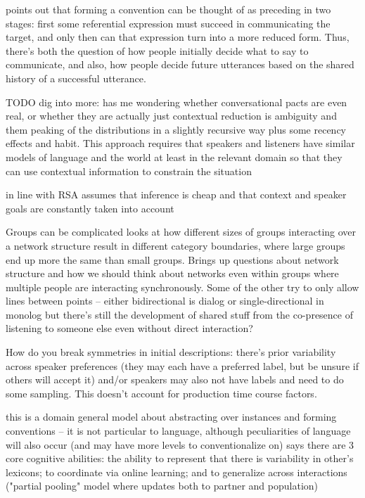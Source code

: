 \documentclass[]{article}
\begin{document}
\cite{leung2023} points out that forming a convention can be thought of as preceding in two stages: first some referential expression must succeed in communicating the target, and only then can that expression turn into a more reduced form. Thus, there's both the question of how people initially decide what to say to communicate, and also, how people decide future utterances based on the shared history of a successful utterance. 

TODO dig into more: \cite{piantadosi2012} has me wondering whether conversational pacts are even real, or whether they are actually just contextual reduction is ambiguity and them peaking of the distributions in a slightly recursive way plus some recency effects and habit. This approach requires that speakers and listeners have similar models of language and the world at least in the relevant domain so that they can use contextual information to constrain the situation 

\cite{piantadosi2012} in line with RSA assumes that inference is cheap and that context and speaker goals are constantly taken into account 

Groups can be complicated \cite{guilbeault2021} looks at how different sizes of groups interacting over a network structure result in different category boundaries, where large groups end up more the same than small groups. Brings up questions about network structure and how we should think about networks even within groups where multiple people are interacting synchronously. Some of the other try to only allow lines between points -- either bidirectional is dialog or single-directional in monolog but there's still the development of shared stuff from the co-presence of listening to someone else even without direct interaction? 


\cite{hawkins2020b} How do you break symmetries in initial descriptions: there's prior variability across speaker preferences (they may each have a preferred label, but be unsure if others will accept it) and/or speakers may also not have labels and need to do some sampling. This doesn't account for production time course factors. 

this is a domain general model about abstracting over instances and forming conventions -- it is not particular to language, although peculiarities of language will also occur (and may have more levels to conventionalize on) 
\cite{hawkins2021} says there are 3 core cognitive abilities: the ability to represent that there is variability in other's lexicons; to coordinate via online learning; and to generalize across interactions ("partial pooling" model where updates both to partner and population) 
\end{document}

